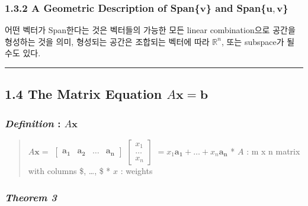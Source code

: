 \documentclass[11pt]{article}
\begin{document}
    \hypertarget{a-geometric-description-of-spanmathbfv-and-spanmathbfu-v}{%
\subsubsection{\texorpdfstring{1.3.2 A Geometric Description of
Span\{\(\mathbf{v}\)\} and
Span\{\(\mathbf{u, v}\)\}}{1.3.2 A Geometric Description of Span\{\textbackslash{}mathbf\{v\}\} and Span\{\textbackslash{}mathbf\{u, v\}\}}}\label{a-geometric-description-of-spanmathbfv-and-spanmathbfu-v}}

어떤 벡터가 Span한다는 것은 벡터들의 가능한 모든 linear combination으로
공간을 형성하는 것을 의미, 형성되는 공간은 조합되는 벡터에 따라
\(\mathbb{R}^n\), 또는 subspace가 될 수도 있다.

    \begin{center}\rule{0.5\linewidth}{\linethickness}\end{center}

\hypertarget{the-matrix-equation-amathbfx-mathbfb}{%
\subsection{\texorpdfstring{1.4 The Matrix Equation
\(A\mathbf{x} = \mathbf{b}\)}{1.4 The Matrix Equation A\textbackslash{}mathbf\{x\} = \textbackslash{}mathbf\{b\}}}\label{the-matrix-equation-amathbfx-mathbfb}}

\hypertarget{definition-amathbfx}{%
\subsubsection{\texorpdfstring{\emph{Definition} :
\(A\mathbf{x}\)}{Definition : A\textbackslash{}mathbf\{x\}}}\label{definition-amathbfx}}

\begin{quote}
\(A\mathbf{x} =\)
\(\begin{bmatrix} \mathbf{a_{1}} & \mathbf{a_{2}} & \dots & \mathbf{a_{n}} \end{bmatrix}\)
\(\begin{bmatrix} x_{1} \\ \dots \\ x_{n} \end{bmatrix}\)
\(= x_{1}\mathbf{a_{1}} + \dots + x_{n}\mathbf{a_{n}}\) * \(A\) : m x n
matrix with columns \$, \dots,  \$ * \(x\) :
weights
\end{quote}

    \hypertarget{theorem-3}{%
\subsubsection{\texorpdfstring{\emph{Theorem
3}}{Theorem 3}}\label{theorem-3}}
\end{document}
